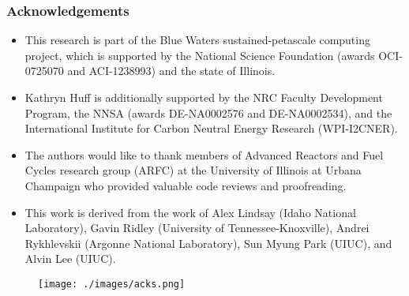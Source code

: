 \begin{frame}
  \frametitle{Acknowledgements}
  \begin{itemize}
    \item This research is part of the Blue Waters sustained-petascale computing project, 
which is supported by the National Science Foundation (awards OCI-0725070 and 
ACI-1238993) and the state of Illinois.
    \item Kathryn Huff is additionally supported by the NRC Faculty Development Program, the NNSA (awards 
    DE-NA0002576 and DE-NA0002534), and the International Institute for Carbon Neutral Energy Research (WPI-I2CNER).
    \item The authors would like to thank  members of Advanced Reactors and Fuel Cycles
research group (ARFC) at the University of Illinois at Urbana Champaign who 
provided valuable code reviews and proofreading.
    \item This work is derived from the work of Alex Lindsay (Idaho National Laboratory), Gavin Ridley (University of 
            Tennessee-Knoxville), Andrei Rykhlevskii (Argonne National 
                  Laboratory), Sun Myung Park (UIUC), and Alvin Lee (UIUC).
  \end{itemize}
    \begin{figure}[t]
   \hspace*{-0.4in}
   \texttt{[image: ./images/acks.png]}
    \end{figure}
\end{frame}
